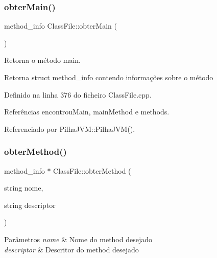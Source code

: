 \mbox{\label{classClassFile_afdbe9cc2f360e04273470202c4f247dc}} 
\subsubsection{\texorpdfstring{obter\+Main()}{obterMain()}}
{\footnotesize\ttfamily method\+\_\+info Class\+File\+::obter\+Main (\begin{DoxyParamCaption}{ }\end{DoxyParamCaption})}



Retorna o método main. 

\begin{DoxyReturn}{Retorna}
struct method\+\_\+info contendo informações sobre o método 
\end{DoxyReturn}


Definido na linha 376 do ficheiro Class\+File.\+cpp.



Referências encontrou\+Main, main\+Method e methods.



Referenciado por Pilha\+J\+V\+M\+::\+Pilha\+J\+V\+M().

\mbox{\label{classClassFile_aac49e7e39f677987b53fdf15787b8106}} 
\subsubsection{\texorpdfstring{obter\+Method()}{obterMethod()}}
{\footnotesize\ttfamily method\+\_\+info $\ast$ Class\+File\+::obter\+Method (\begin{DoxyParamCaption}\item[{string}]{nome,  }\item[{string}]{descriptor }\end{DoxyParamCaption})}


\begin{DoxyParams}{Parâmetros}
{\em nome} & Nome do method desejado \\
\hline
{\em descriptor} & Descritor do method desejado \\
\hline
\end{DoxyParams}


